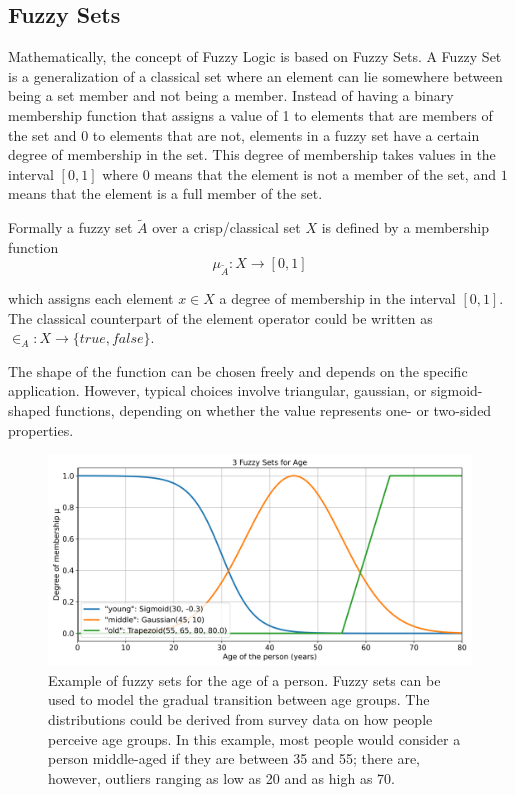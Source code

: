 \subsection{Fuzzy Sets}

Mathematically, the concept of Fuzzy Logic is based on Fuzzy Sets. A Fuzzy Set is a generalization of a classical set where an element can lie somewhere between being a set member and not being a member. Instead of having a binary membership function that assigns a value of 1 to elements that are members of the set and 0 to elements that are not, elements in a fuzzy set have a certain degree of membership in the set. This degree of membership takes values in the interval $[0, 1]$ where $0$ means that the element is not a member of the set, and $1$ means that the element is a full member of the set.

Formally a fuzzy set $\tilde{A}$ over a crisp/classical set $X$ is defined by a membership function
\begin{equation}
      \mu_{\tilde{A}}: X \rightarrow [0, 1]
\end{equation}

which assigns each element $x \in X$ a degree of membership in the interval $[0, 1]$. The classical counterpart of the element operator could be written as $\in_A: X \rightarrow \{true, false\}$.

The shape of the function can be chosen freely and depends on the specific application. However, typical choices involve triangular, gaussian, or sigmoid-shaped functions, depending on whether the value represents one- or two-sided properties.


\begin{figure}[H]
      \centering
      \includegraphics[width=0.8\columnwidth,trim={0 0 0 1cm},clip]{figures/Intro/age-fuzzy-sets.png}
      \caption[Example of fuzzy sets for the age of a person.]      {Example of fuzzy sets for the age of a person. Fuzzy sets can be used to model the gradual transition between age groups. The distributions could be derived from survey data on how people perceive age groups. In this example, most people would consider a person middle-aged if they are between 35 and 55; there are, however, outliers ranging as low as 20 and as high as 70.}
      \label{fig:fuzzy_sets}
\end{figure}

